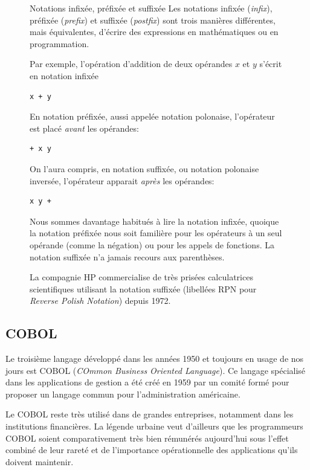 \begin{figure}[t]
  \label{fig:informatique:notations}
  \setlength{\FrameRule}{1pt}
  \begin{emphbox}{\mdseries Notations infixée, préfixée et suffixée}
    Les notations infixée (\emph{infix}), préfixée (\emph{prefix}) et
    suffixée (\emph{postfix}) sont trois manières différentes, mais
    équivalentes, d'écrire des expressions en mathématiques ou en
    programmation.

    Par exemple, l'opération d'addition de deux opérandes $x$ et $y$
    s'écrit en notation infixée
\begin{lstlisting}[backgroundcolor=\color{codebg}]
x + y
\end{lstlisting}
    En notation préfixée, aussi appelée notation polonaise,
    l'opérateur est placé \emph{avant} les opérandes:
\begin{lstlisting}[backgroundcolor=\color{codebg}]
+ x y
\end{lstlisting}
    On l'aura compris, en notation suffixée, ou notation polonaise
    inversée, l'opérateur apparait \emph{après} les opérandes:
\begin{lstlisting}[backgroundcolor=\color{codebg}]
x y +
\end{lstlisting}
    Nous sommes davantage habitués à lire la notation infixée, quoique
    la notation préfixée nous soit familière pour les opérateurs à un
    seul opérande (comme la négation) ou pour les appels de fonctions.
    La notation suffixée n'a jamais recours aux parenthèses.

    La compagnie HP commercialise de très prisées calculatrices
    scientifiques utilisant la notation suffixée (libellées RPN pour
    \emph{Reverse Polish Notation}) depuis 1972.
  \end{emphbox}
\end{figure}

\subsection{COBOL}
\label{sec:informatique:historique:cobol}

Le troisième langage développé dans les années 1950 et toujours en
usage de nos jours est COBOL (\emph{COmmon Business Oriented
  Language}). Ce langage spécialisé dans les applications de gestion a
été créé en 1959 par un comité formé pour proposer un langage commun
pour l'administration américaine.

Le COBOL reste très utilisé dans de grandes entreprises, notamment
dans les institutions financières. La légende urbaine veut d'ailleurs
que les programmeurs COBOL soient comparativement très bien rémunérés
aujourd'hui sous l'effet combiné de leur rareté et de l'importance
opérationnelle des applications qu'ils doivent maintenir.

